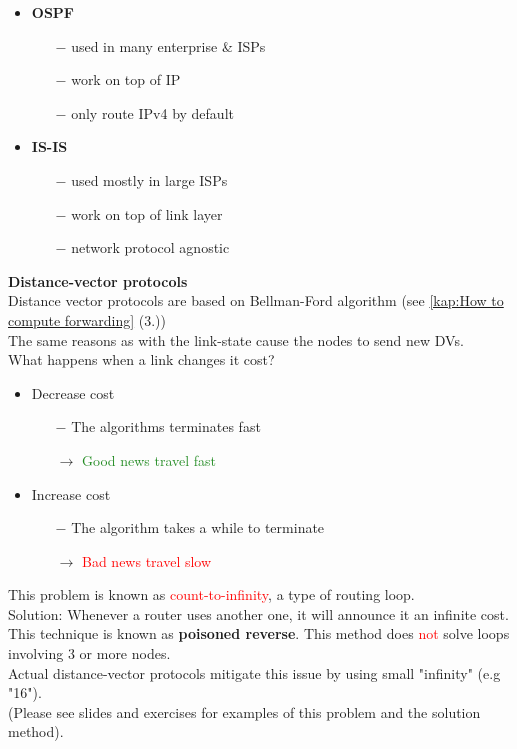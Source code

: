 \documentclass[a4paper, fontsize=8pt, landscape, DIV=1]{scrartcl}
\begin{document}
\begin{multicols*}{4}
		\begin{itemize}[noitemsep]
			\item \textbf{OSPF}
			\begin{itemize}
				\item[$-$] used in many enterprise \& ISPs
				\item[$-$] work on top of IP
				\item[$-$] only route IPv4 by default
			\end{itemize}
			\item \textbf{IS-IS}
			\begin{itemize}
				\item[$-$] used mostly in large ISPs
				\item[$-$] work on top of link layer
				\item[$-$] network protocol agnostic
			\end{itemize}
		\end{itemize} 
		\par
		
		\textbf{Distance-vector protocols}\\
		Distance vector protocols are based on Bellman-Ford algorithm (see
		\ref{kap:How to compute forwarding} (3.))\\
		The same reasons as with the link-state cause the nodes to send new DVs.\\
		What happens when a link changes it cost?
		\vspace{-0.2cm}
		\begin{itemize}[noitemsep]
			\item Decrease cost
			\begin{itemize}
				\item[$-$] The algorithms terminates fast
				\item[$\rightarrow$] \textcolor{ForestGreen}{Good news travel fast}
			\end{itemize}
			\item Increase cost
			\begin{itemize}
				\item[$-$] The algorithm takes a while to terminate
				\item[$\rightarrow$] \textcolor{Red}{Bad news travel slow}
			\end{itemize}
		\end{itemize}
		This problem is known as \textcolor{Red}{count-to-infinity}, a type of routing
		loop.\\
		Solution: Whenever a router uses another one, it will announce it an infinite
		cost. This technique is known as \textbf{poisoned reverse}. This method does
		\textcolor{Red}{not} solve loops involving 3 or more nodes.\\
		Actual distance-vector protocols mitigate this issue by using small "infinity"
		(e.g "16").\\
		(Please see slides and exercises for examples of this problem and the solution
		method).\par
		

\end{multicols*}
\end{document}
